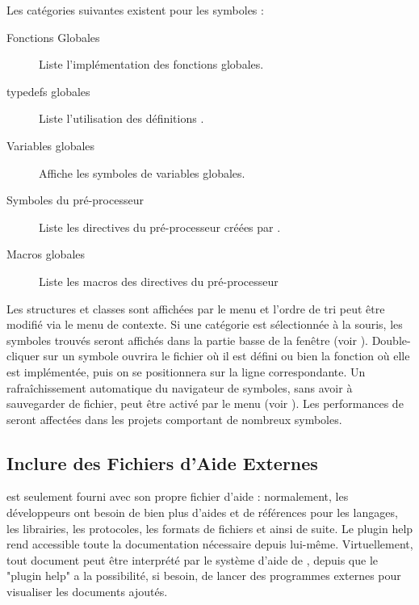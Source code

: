 Les catégories suivantes existent pour les symboles :

\begin{description}
\item[Fonctions Globales] Liste l'implémentation des fonctions globales.
\item[typedefs globales] Liste l'utilisation des définitions .
\item[Variables globales] Affiche les symboles de variables globales.
\item[Symboles du pré-processeur] Liste les directives du pré-processeur créées par .
\item[Macros globales] Liste les macros des directives du pré-processeur
\end{description}


Les structures et classes sont affichées par le menu  et l'ordre de tri peut être modifié via le menu de contexte. Si une catégorie est sélectionnée à la souris, les symboles trouvés seront affichés dans la partie basse de la fenêtre (voir ). Double-cliquer sur un symbole ouvrira le fichier où il est défini ou bien la fonction où elle est implémentée, puis on se positionnera sur la ligne correspondante. Un rafraîchissement automatique du navigateur de symboles, sans avoir à sauvegarder de fichier, peut être activé par le menu  (voir ). Les performances de \codeblocks seront affectées dans les projets comportant de nombreux symboles.



\subsection{Inclure des Fichiers d'Aide Externes}

\codeblocks est seulement fourni avec son propre fichier d'aide : normalement, les développeurs ont besoin de bien plus d'aides et de références pour les langages, les librairies, les protocoles, les formats de fichiers et ainsi de suite. Le plugin help rend accessible toute la documentation nécessaire depuis \codeblocks lui-même. Virtuellement, tout document peut être interprété par le système d'aide de \codeblocks, depuis que le "plugin help" a la possibilité, si besoin, de lancer des programmes externes pour visualiser les documents ajoutés.

